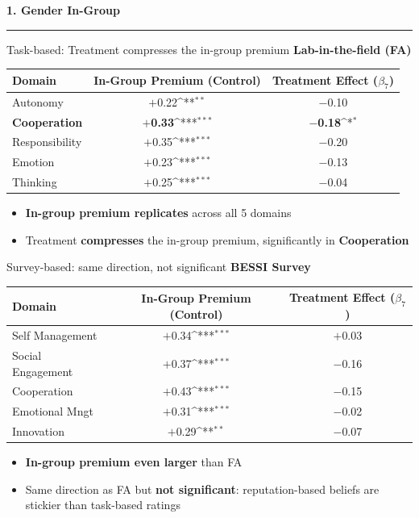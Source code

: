 \documentclass[xcolor=usenames,dvipsnames]{beamer}
\newcommand{\sym}[1]{\ifmmode^{#1}\else$^{#1}$\fi}
\begin{document}
\begin{frame}[plain]
\vspace{2.5cm}
{\Large \textbf{1. Gender In-Group}}\\
{\color{HopBlue}\rule{0.5\linewidth}{2pt}}
\end{frame}
\begin{frame}{Task-based: Treatment compresses the in-group premium}
\small
\textbf{Lab-in-the-field (FA)}
\footnotesize
\begin{center}
\begin{tabular}{lcc}
\toprule
Domain & In-Group Premium (Control) & Treatment Effect ($\beta_7$) \\
\midrule
Autonomy & $+$0.22\sym{**} & $-$0.10 \\
\textbf{Cooperation} & $+$\textbf{0.33}\sym{***} & $-$\textbf{0.18}\sym{*} \\
Responsibility & $+$0.35\sym{***} & $-$0.20 \\
Emotion & $+$0.23\sym{***} & $-$0.13 \\
Thinking & $+$0.25\sym{***} & $-$0.04 \\
\bottomrule
\end{tabular}
\end{center}
\vspace{0.3cm}
\small
\begin{itemize}
\item[$\Rightarrow$] \textcolor{HopBlue}{\textbf{In-group premium replicates}} across all 5 domains 
\item[$\Rightarrow$] Treatment \textcolor{HopBlue}{\textbf{compresses}} the in-group premium, significantly in \textbf{Cooperation} 
\end{itemize}
\end{frame}
\begin{frame}{Survey-based: same direction, not significant}
\small
\textbf{BESSI Survey}
\footnotesize
\begin{center}
\begin{tabular}{lcc}
\toprule
Domain & In-Group Premium (Control) & Treatment Effect ($\beta_7$) \\
\midrule
Self Management & $+$0.34\sym{***} & $+$0.03 \\
Social Engagement & $+$0.37\sym{***} & $-$0.16 \\
Cooperation & $+$0.43\sym{***} & $-$0.15 \\
Emotional Mngt & $+$0.31\sym{***} & $-$0.02 \\
Innovation & $+$0.29\sym{**} & $-$0.07 \\
\bottomrule
\end{tabular}
\end{center}
\vspace{0.3cm}
\small
\begin{itemize}
\item[$\Rightarrow$] \textcolor{HopBlue}{\textbf{In-group premium even larger}} than FA 
\item[$\Rightarrow$] Same direction as FA but \textbf{not significant}: reputation-based beliefs are stickier than task-based ratings
\end{itemize}
\end{frame}
\end{document}
